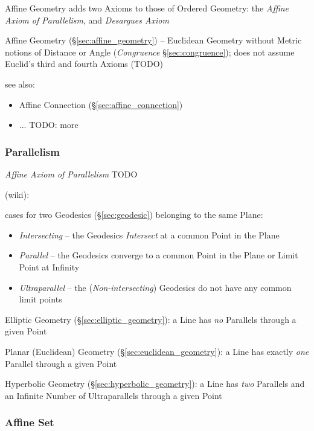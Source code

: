 Affine Geometry adds two Axioms to those of Ordered Geometry: the \emph{Affine
  Axiom of Parallelism}, and \emph{Desargues Axiom}

Affine Geometry (\S\ref{sec:affine_geometry}) -- Euclidean Geometry without
Metric notions of Distance or Angle (\emph{Congruence} \S\ref{sec:congruence});
does not assume Euclid's third and fourth Axioms (TODO)

see also:
\begin{itemize}
  \item Affine Connection (\S\ref{sec:affine_connection})
  \item ... TODO: more
\end{itemize}



\subsubsection{Parallelism}\label{sec:parallelism}

\emph{Affine Axiom of Parallelism} TODO

\asterism

(wiki):

cases for two Geodesics (\S\ref{sec:geodesic}) belonging to the same Plane:
\begin{itemize}
  \item \emph{Intersecting} -- the Geodesics \emph{Intersect} at a common Point
    in the Plane
  \item \emph{Parallel} -- the Geodesics converge to a common Point in the Plane
    or Limit Point at Infinity
  \item \emph{Ultraparallel} -- the (\emph{Non-intersecting}) Geodesics do not
    have any common limit points
\end{itemize}

\asterism

\fist Elliptic Geometry (\S\ref{sec:elliptic_geometry}): a Line has \emph{no}
  Parallels through a given Point

\fist Planar (Euclidean) Geometry (\S\ref{sec:euclidean_geometry}): a Line has
  exactly \emph{one} Parallel through a given Point

\fist Hyperbolic Geometry (\S\ref{sec:hyperbolic_geometry}): a Line has
\emph{two} Parallels and an Infinite Number of Ultraparallels through a
given Point



\subsubsection{Affine Set}\label{sec:affine_set}

